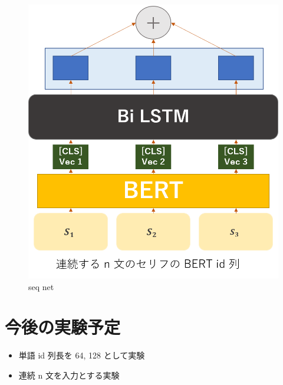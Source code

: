 \documentclass[twocolumn]{jarticle}     %
\begin{document}
\begin{figure}[!htb]
  \begin{center}
    \includegraphics[scale=0.45]{net.png}
    \caption{seq net} %
    \label{fig:net} %
  \end{center}
\end{figure}

\newpage

\section{今後の実験予定}
\begin{itemize}
  \item 単語 id 列長を 64, 128 として実験
  \item 連続 n 文を入力とする実験
\end{itemize}



\end{document}
